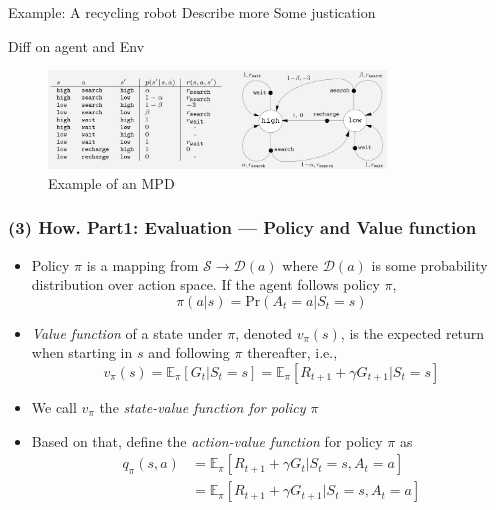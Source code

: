 \documentclass[10pt]{beamer}
\theoremstyle{remark}
\begin{document}
\begin{frame}
   Example: A recycling robot
   Describe more
   Some justication 

   Diff on agent and Env
    \begin{figure}
        \includegraphics[width=0.8\textwidth]{figures/MDP_present.png}
        \caption{Example of an MPD}
    \end{figure}
\end{frame}


\begin{frame}
    \frametitle{(3) How. Part1: Evaluation --- Policy and Value function}
    \begin{itemize}
        \item Policy $\pi$ is a mapping from $\mathcal{S} \longrightarrow \mathcal{D}(a)$ where $\mathcal{D}(a)$ is some probability distribution over action space. If the agent follows policy $\pi$,  
            \[ \pi(a|s) = \text{Pr}(A_t =a| S_t = s)\]
        \item \textit{Value function} of a state under $\pi$, denoted $v_\pi(s)$, is the expected return when starting in $s$ and following $\pi$ thereafter, i.e.,
             \[
                 v_\pi(s) = \mathbb{E}_{\pi}[G_t | S_t =s] = \mathbb{E}_{\pi} \left[ R_{t+1} + \gamma G_{t+1} | S_t =s \right]
            \] 
        \item We call $v_\pi$  the \textit{state-value function for policy  $\pi$}
        \item Based on that, define the \textit{action-value function} for policy $\pi$ as
             \begin{align*}
                 q_\pi(s, a) &= \mathbb{E}_{\pi}[R_{t+1} + \gamma G_t | S_t =s, A_t = a] \\
                             &= \mathbb{E}_{\pi} \left[ R_{t+1} + \gamma G_{t+1} | S_t=s, A_t=a \right]
            \end{align*} 
    \end{itemize}
\end{frame}
\end{document}
